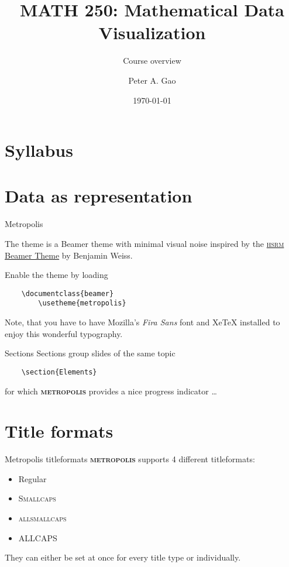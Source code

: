 \documentclass{beamer}
\title{MATH 250: Mathematical Data Visualization}
\subtitle{Course overview}
\date{\today}
\author{Peter A. Gao}
\institute{San Jos\'e State University}
\newcommand{\themename}{\textbf{\textsc{metropolis}}\xspace}
\begin{document}
\maketitle

\section{Syllabus}


\section{Data as representation}

\begin{frame}[fragile]{Metropolis}
	
	The theme is a Beamer theme with minimal visual noise
	inspired by the \href{https://github.com/hsrmbeamertheme/hsrmbeamertheme}{\textsc{hsrm} Beamer
		Theme} by Benjamin Weiss.
	
	Enable the theme by loading
	
	\begin{verbatim}    \documentclass{beamer}
		\usetheme{metropolis}\end{verbatim}
	
	Note, that you have to have Mozilla's \emph{Fira Sans} font and XeTeX
	installed to enjoy this wonderful typography.
\end{frame}

\begin{frame}[fragile]{Sections}
	Sections group slides of the same topic
	
	\begin{verbatim}    \section{Elements}\end{verbatim}
	
	for which \themename provides a nice progress indicator \ldots
	
\end{frame}

\section{Title formats}

\begin{frame}{Metropolis titleformats}
	\themename supports 4 different titleformats:
	\begin{itemize}
		\item Regular
		\item \textsc{Smallcaps}
		\item \textsc{allsmallcaps}
		\item ALLCAPS
	\end{itemize}
	They can either be set at once for every title type or individually.
\end{frame}
\end{document}
